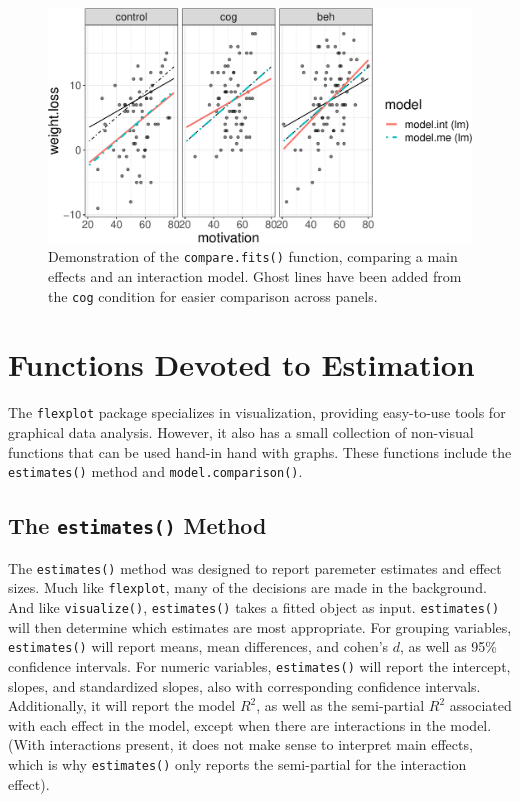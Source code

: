 \documentclass[
  man]{apa6}
\begin{document}
\begin{figure}
\centering
\includegraphics{flexplot_psychmeth_files/figure-latex/compare-1.pdf}
\caption{\label{fig:compare}Demonstration of the \texttt{compare.fits()} function, comparing a main effects and an interaction model. Ghost lines have been added from the \texttt{cog} condition for easier comparison across panels. \label{fig:compare}}
\end{figure}

\normalsize

\hypertarget{functions-devoted-to-estimation}{%
\section{Functions Devoted to Estimation}\label{functions-devoted-to-estimation}}

The \texttt{flexplot} package specializes in visualization, providing easy-to-use tools for graphical data analysis. However, it also has a small collection of non-visual functions that can be used hand-in hand with graphs. These functions include the \texttt{estimates()} method and \texttt{model.comparison()}.

\hypertarget{the-estimates-method}{%
\subsection{\texorpdfstring{The \texttt{estimates()} Method}{The estimates() Method}}\label{the-estimates-method}}

The \texttt{estimates()} method was designed to report paremeter estimates and effect sizes. Much like \texttt{flexplot}, many of the decisions are made in the background. And like \texttt{visualize()}, \texttt{estimates()} takes a fitted object as input. \texttt{estimates()} will then determine which estimates are most appropriate. For grouping variables, \texttt{estimates()} will report means, mean differences, and cohen's \(d\), as well as 95\% confidence intervals. For numeric variables, \texttt{estimates()} will report the intercept, slopes, and standardized slopes, also with corresponding confidence intervals. Additionally, it will report the model \(R^2\), as well as the semi-partial \(R^2\) associated with each effect in the model, except when there are interactions in the model. (With interactions present, it does not make sense to interpret main effects, which is why \texttt{estimates()} only reports the semi-partial for the interaction effect).
\end{document}
